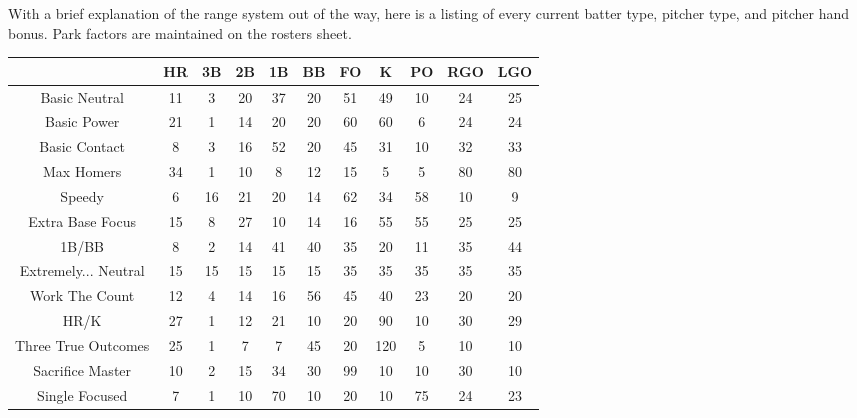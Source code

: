 
With a brief explanation of the range system out of the way, 
here is a listing of every current batter type, pitcher type, and pitcher hand bonus. 
Park factors are maintained on the rosters sheet.

\begin{center}
	\begin{tabular}{|c|c|c|c|c|c|c|c|c|c|c|}
		\hline
		                     & HR & 3B & 2B & 1B & BB & FO & K   & PO & RGO & LGO    \\
		\hline 
		Basic Neutral        & 11 & 3  & 20 & 37 & 20 & 51 & 49  & 10 & 24  & 25     \\
		\hline
		Basic Power          & 21 & 1  & 14 & 20 & 20 & 60 & 60  & 6  & 24  & 24     \\
		\hline
		Basic Contact        & 8  & 3  & 16 & 52 & 20 & 45 & 31  & 10 & 32  & 33     \\
		\hline
		Max Homers           & 34 & 1  & 10  & 8  & 12  & 15 & 5   & 5  & 80  & 80     \\
		\hline
		Speedy               & 6  & 16 & 21 & 20 & 14 & 62 & 34  & 58 & 10  & 9      \\
		\hline
		Extra Base Focus     & 15 & 8  & 27 & 10 & 14  & 16 & 55  & 55 & 25  & 25     \\
		\hline
		1B/BB                & 8  & 2  & 14 & 41 & 40 & 35 & 20  & 11  & 35  & 44     \\
		\hline
		Extremely... Neutral & 15 & 15 & 15 & 15 & 15 & 35 & 35  & 35 & 35  & 35     \\
		\hline
		Work The Count       & 12 & 4  & 14 & 16 & 56 & 45 & 40  & 23 & 20  & 20     \\
		\hline
		HR/K                 & 27 & 1  & 12 & 21 & 10 & 20 & 90  & 10  & 30  & 29     \\
		\hline
		Three True Outcomes  & 25 & 1  & 7  & 7 & 45 & 20 & 120 & 5  & 10  & 10     \\
		\hline
		Sacrifice Master     & 10 & 2  & 15 & 34 & 30 & 99 & 10  & 10 & 30  & 10     \\
		\hline
		Single Focused       & 7 & 1  & 10 & 70 & 10 & 20 & 10  & 75 & 24  & 23     \\
		\hline
	\end{tabular}
\end{center}

